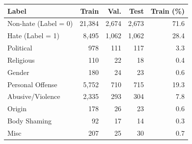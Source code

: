 \begin{tabular}{lrrrr}
\toprule
Label & Train & Val. & Test & Train (\%) \\
\midrule
Non-hate (Label = 0) & 21{,}384 & 2{,}674 & 2{,}673 & 71.6 \\
Hate (Label = 1) & 8{,}495 & 1{,}062 & 1{,}062 & 28.4 \\
\midrule
Political & 978 & 111 & 117 & 3.3 \\
Religious & 110 & 22 & 18 & 0.4 \\
Gender & 180 & 24 & 23 & 0.6 \\
Personal Offense & 5{,}752 & 710 & 715 & 19.3 \\
Abusive/Violence & 2{,}335 & 293 & 304 & 7.8 \\
Origin & 178 & 26 & 23 & 0.6 \\
Body Shaming & 92 & 17 & 14 & 0.3 \\
Misc & 207 & 25 & 30 & 0.7 \\
\bottomrule
\end{tabular}
